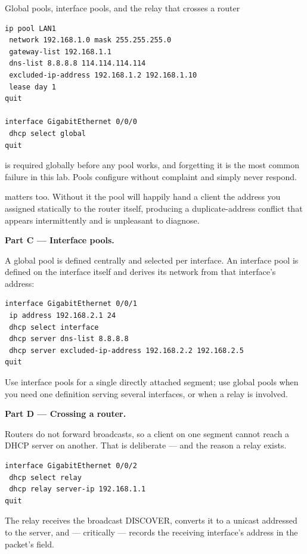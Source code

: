 \begin{labproject}{Global pools, interface pools, and the relay that crosses a router}
\begin{lstlisting}[style=dcnterminal]
ip pool LAN1
 network 192.168.1.0 mask 255.255.255.0
 gateway-list 192.168.1.1
 dns-list 8.8.8.8 114.114.114.114
 excluded-ip-address 192.168.1.2 192.168.1.10
 lease day 1
quit

interface GigabitEthernet 0/0/0
 dhcp select global
quit
\end{lstlisting}

\begin{pitfall}
 is required globally before any pool works, and forgetting it is the most common failure in this lab. Pools configure without complaint and simply never respond.

 matters too. Without it the pool will happily hand a client the address you assigned statically to the router itself, producing a duplicate-address conflict that appears intermittently and is unpleasant to diagnose.
\end{pitfall}

\medskip\noindent\textbf{Part C --- Interface pools.}\par
A global pool is defined centrally and selected per interface. An interface pool is defined on the interface itself and derives its network from that interface's address:

\begin{lstlisting}[style=dcnterminal]
interface GigabitEthernet 0/0/1
 ip address 192.168.2.1 24
 dhcp select interface
 dhcp server dns-list 8.8.8.8
 dhcp server excluded-ip-address 192.168.2.2 192.168.2.5
quit
\end{lstlisting}

Use interface pools for a single directly attached segment; use global pools when you need one definition serving several interfaces, or when a relay is involved.

\medskip\noindent\textbf{Part D --- Crossing a router.}\par
Routers do not forward broadcasts, so a client on one segment cannot reach a DHCP server on another. That is deliberate --- and the reason a relay exists.

\begin{lstlisting}[style=dcnterminal]
interface GigabitEthernet 0/0/2
 dhcp select relay
 dhcp relay server-ip 192.168.1.1
quit
\end{lstlisting}

\begin{keyidea}
The relay receives the broadcast DISCOVER, converts it to a unicast addressed to the server, and --- critically --- records the receiving interface's address in the packet's  field.


\end{keyidea}
\end{labproject}
